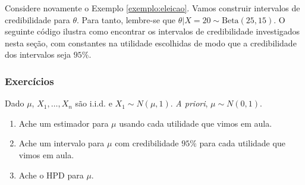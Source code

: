 \begin{example}
Considere novamente o Exemplo \ref{exemplo:eleicao}.
Vamos construir intervalos de credibilidade
para $\theta$.
Para tanto, lembre-se que $\theta|X=20 \sim \mbox{Beta}(25,15)$.
O seguinte código ilustra como encontrar os intervalos de credibilidade
investigados nesta seção, com constantes na utilidade escolhidas de modo que a credibilidade dos intervalos seja $95\%$.


\begin{knitrout}
\color{fgcolor}\begin{kframe}
\begin{alltt}
 \hlkwb{<-}  
 \hlkwb{<-}  
\end{alltt}
\end{kframe}
\end{knitrout}


\end{example}

\subsubsection*{Exercícios}

\begin{exercise}
 \label{ex:normal-credible}
 Dado $\mu$, $X_{1},\ldots,X_{n}$ são i.i.d. e 
 $X_{1} \sim N(\mu,1)$.
 \emph{A priori}, $\mu \sim N(0,1)$.
 \begin{enumerate}[label=(\alph*)]
  \item Ache um estimador para $\mu$ usando 
  cada utilidade que vimos em aula.
  \item Ache um intervalo para $\mu$ com 
  credibilidade $95\%$ para 
  cada utilidade que vimos em aula.
  \item Ache o HPD para $\mu$.
 \end{enumerate}
\end{exercise}

